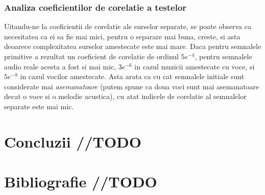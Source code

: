 \documentclass[12pt]{article}
\begin{document}
\subsubsection{Analiza coeficientilor de corelatie a testelor}
Uitandu-ne la coeficientii de corelatie ale surselor separate, se poate observa ca necesitatea ca ei sa fie mai mici, pentru o separare mai buna, creste, si asta deoarece complexitatea surselor amestecate este mai mare. Daca pentru semnalele primitive a rezultat un coeficient de corelatie de ordinul $5e^{-4}$, pentru semnalele audio reale acesta a fost si mai mic, $3e^{-6}$ in cazul muzicii amestecate cu voce, si $5e^{-8}$ in cazul vocilor amestecate. Asta arata ca cu cat semnalele initiale sunt considerate mai \textit{asemanatoare} (putem spune ca doua voci sunt mai asemanatoare decat o voce si o melodie acustica), cu atat indicele de corelatie al semnalelor separate este mai mic.
\newpage
\section{Concluzii //TODO}
\section{Bibliografie //TODO}



\newpage
\cite{hyvarien}
\newpage
\end{document}
